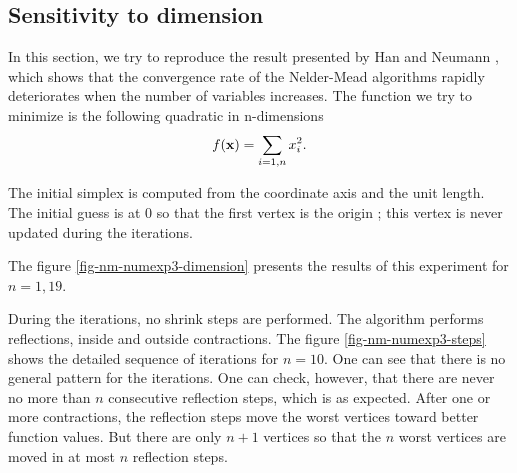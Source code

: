 \subsection{Sensitivity to dimension}

In this section, we try to reproduce the result 
presented by Han and Neumann \cite{HanNeumann2006}, which shows that the 
convergence rate of the Nelder-Mead algorithms rapidly 
deteriorates when the number of variables increases.
The function we try to minimize is the following quadratic 
in n-dimensions 
\begin{eqnarray}
\label{quadratic-function3}
f(\bold{x}) = \sum_{i=1,n} x_i^2.
\end{eqnarray}

The initial simplex is computed from the coordinate axis and the unit length.
The initial guess is at 0 so that the first vertex is the origin ; 
this vertex is never updated during the iterations.

The figure \ref{fig-nm-numexp3-dimension} presents the results of this 
experiment for $n=1,19$. 

During the iterations, no shrink steps are performed. The 
algorithm performs reflections, inside and outside contractions.
The figure \ref{fig-nm-numexp3-steps} shows the detailed sequence of 
iterations for $n=10$. One can see that there is no general 
pattern for the iterations. One can check, however, that there 
are never no more than $n$ consecutive reflection steps, which is 
as expected. After one or more contractions, the reflection
steps move the worst vertices toward better function values.
But there are only $n+1$ vertices so that the $n$ worst 
vertices are moved in at most $n$ reflection steps.

